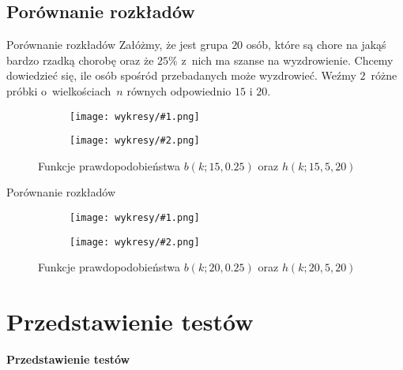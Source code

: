\documentclass{beamer}
\newcommand{\1}[1]{\mathds{1}\left(#1\right)}
\newenvironment{diagrams}[2]{\begin{figure}[p]
		\begin{subfigure}{.4\textwidth}
			\centering
			\texttt{[image: wykresy/\#1.png]}
			\caption{}
			\label{#1}
		\end{subfigure}
		\begin{subfigure}{.4\textwidth}
			\centering
			\texttt{[image: wykresy/\#2.png]}
			\caption{}
			\label{#2}
		\end{subfigure}
	}
	{
	\end{figure}
}
\begin{document}
\subsection{Porównanie rozkładów}
\begin{frame}{Porównanie rozkładów}
Załóżmy, że jest grupa $20$ osób, które są chore na jakąś bardzo rzadką chorobę oraz że $25\%$ z~nich ma szanse na wyzdrowienie. Chcemy dowiedzieć się, ile osób spośród przebadanych może wyzdrowieć. Weźmy $2$~różne próbki o~wielkościach~$n$ równych odpowiednio $15$ i $20$. 

\begin{diagrams}{b_pmf15}{hg_pmf15}
	\caption{Funkcje prawdopodobieństwa $b(k;15,0.25)$ oraz $h(k;15,5,20)$}
	\label{pmf15}
\end{diagrams}

\end{frame}

\begin{frame}{Porównanie rozkładów}
\begin{diagrams}{b_pmf20}{hg_pmf20}
	\caption{Funkcje prawdopodobieństwa $b(k;20,0.25)$ oraz $h(k;20,5,20)$}
	\label{pmf20}
\end{diagrams}
\end{frame}

%
%
%

\section{Przedstawienie testów}
\begin{frame}
	\begin{alertblock}{\centering \Huge \textbf{Przedstawienie testów}}
	\end{alertblock}
\end{frame}
\end{document}
